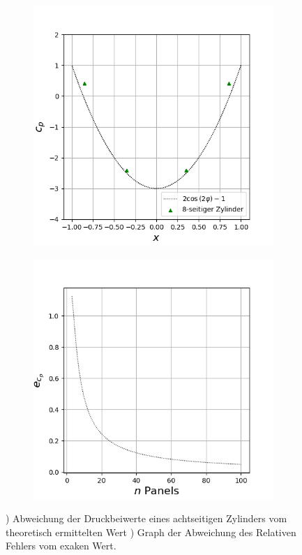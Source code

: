 \begin{figure}[ht]
  \centering
  \begin{subfigure}[b]{0.5\linewidth}
    \centering\includegraphics[scale=0.6]{figures/theoretical.png} 
    \caption{\label{fig:theoreticalcylinder}}
  \end{subfigure}%
  \begin{subfigure}[b]{0.5\linewidth}
    \centering\includegraphics[scale=0.6]{figures/absoluteerror.png} 
    \caption{\label{fig:absoluteerror}}
  \end{subfigure}
  \caption{) Abweichung der Druckbeiwerte eines achtseitigen Zylinders vom theoretisch ermittelten Wert ) Graph der Abweichung des Relativen Fehlers vom exaken Wert.}
\end{figure}
